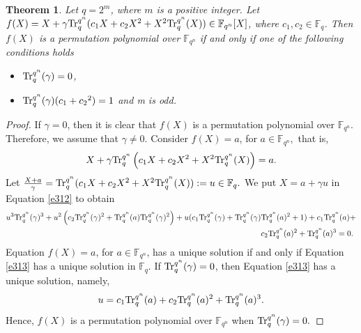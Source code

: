 \documentclass[11pt]{amsart}
\theoremstyle{plain}
\newtheorem{thm}{Theorem}[section]
\numberwithin{equation}{section}
\theoremstyle{definition}
\newcommand{\F}{\mathbb F}
\def\Tr{{\rm Tr}}
\begin{document}
\begin{thm}\label{T36}
    Let $q=2^m$, where $m$ is a positive integer. Let $f(X)=X+\gamma \Tr_{q}^{q^n}(c_1X+c_2X^2+X^2\Tr_{q}^{q^n}(X))\in \F_{q^n}[X]$, where $c_1, c_2 \in \F_q$. Then $f(X)$ is a permutation polynomial over $\F_{q^n}$ if and only if one of the following conditions holds
    \begin{itemize}
        \item $\Tr_{q}^{q^n}(\gamma)=0$,
        \item $\Tr_{q}^{q^n}(\gamma)(c_1+{c_2}^2)=1$ and m is odd.
    \end{itemize}
\end{thm}
\begin{proof}
If $\gamma=0$, then it is clear that $f(X)$ is a permutation polynomial over $\F_{q^n}.$ Therefore, we assume that $\gamma \neq 0.$ Consider $f(X)=a$, for $a \in \F_{q^n},$ that is, 
\begin{equation}\label{e312}
    X+\gamma \Tr_{q}^{q^n}\left(c_1X+c_2X^2+X^2\Tr_{q}^{q^n}(X)\right)=a.
\end{equation}
    Let $\frac{X+a}{\gamma}=\Tr_{q}^{q^n}(c_1X+c_2X^2+X^2\Tr_{q}^{q^n}(X)):=u \in \F_q.$ We put $X=a+\gamma u$ in Equation \eqref{e312} to obtain 
    \begin{equation}\label{e313}
    \begin{split}
          u^3\Tr_{q}^{q^n}(\gamma)^3+u^2\left(c_2\Tr_{q}^{q^n}(\gamma)^2+\Tr_{q}^{q^n}(a)\Tr_{q}^{q^n}(\gamma)^2\right)+u(c_1\Tr_{q}^{q^n}(\gamma)+\Tr_{q}^{q^n}(\gamma)&\Tr_{q}^{q^n}(a)^2+1)+c_1\Tr_{q}^{q^n}(a)+\\& c_2\Tr_{q}^{q^n}(a)^2+\Tr_{q}^{q^n}(a)^3=0.
        \end{split}
    \end{equation}
   Equation $f(X)=a$, for $a \in \F_{q^n}$, has a unique solution if and only if Equation \eqref{e313} has a unique solution in $\F_q$. If $\Tr_{q}^{q^n}(\gamma)=0$, then Equation \eqref{e313} has a unique solution, namely, 
   $$u=c_1\Tr_{q}^{q^n}(a)+c_2\Tr_{q}^{q^n}(a)^2+\Tr_{q}^{q^n}(a)^3.$$
   Hence, $f(X)$ is a permutation polynomial over $\F_{q^n}$ when 
   $\Tr_{q}^{q^n}(\gamma)=0.$
   

\end{proof}
\end{document}
